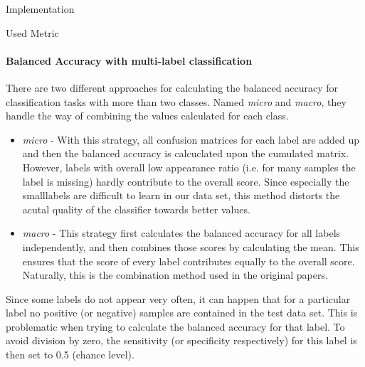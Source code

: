 \begin{section}{Implementation}
\begin{subsection}{Used Metric}
		\paragraph{Balanced Accuracy with multi-label classification}
		There are two different approaches for calculating the balanced accuracy for classification tasks with more than two classes. Named \emph{micro} and \emph{macro}, they handle the way of combining the values calculated for each class.
		\begin{itemize}
			\item \emph{micro} - With this strategy, all confusion matrices for each label are added up and then the balanced accuracy is calcuclated upon the cumulated matrix. However, labels with overall low appearance ratio (i.e. for many samples the label is missing) hardly contribute to the overall score. Since especially the \glqq small\grqq labels are difficult to learn in our data set, this method distorts the acutal quality of the classifier towards better values.
			\item \emph{macro} - This strategy first calculates the balanced accuracy for all labels independently, and then combines those scores by calculating the mean. This ensures that the score of every label contributes equally to the overall score. Naturally, this is the combination method used in the original papers.
		\end{itemize}
		Since some labels do not appear very often, it can happen that for a particular label no positive (or negative) samples are contained in the test data set. This is problematic when trying to calculate the balanced accuracy for that label. To avoid division by zero, the sensitivity (or specificity respectively) for this label is then set to 0.5 (chance level).
		

	\end{subsection}
\end{section}